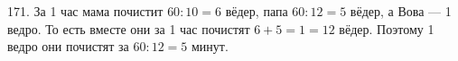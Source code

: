 171. За 1 час мама почистит $60:10=6$ вёдер, папа $60:12=5$ вёдер, а Вова --- 1 ведро. То есть вместе они за 1 час почистят $6+5=1=12$ вёдер. Поэтому 1 ведро они почистят за $60:12=5$ минут.\\
